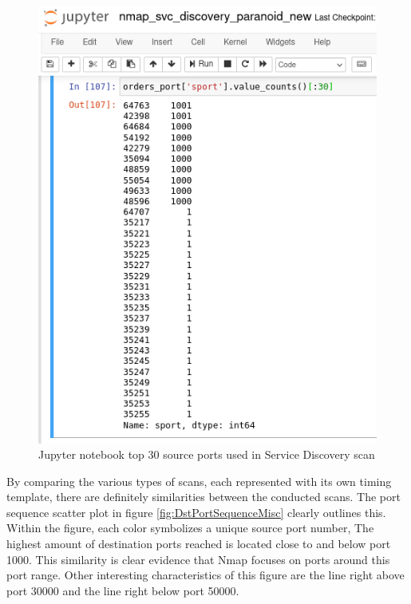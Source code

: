 \begin{figure}[ht]%
    \centering
    \includegraphics[scale=0.35]{images/analysis/svcscan/JupyterSvcSrcUniquePorts.png}
    \caption{Jupyter notebook top 30 source ports used in Service Discovery scan}%
    \label{fig:JupyterSvcSrcPort}%
\end{figure}



By comparing the various types of scans, each represented with its own timing template, there are definitely similarities between the conducted scans. The port sequence scatter plot in figure \ref{fig:DstPortSequenceMisc} clearly outlines this.
Within the figure, each color symbolizes a unique source port number,
The highest amount of destination ports reached is located close to and below port 1000.
This similarity is clear evidence that Nmap focuses on ports around this port range.
Other interesting characteristics of this figure are the line right above port 30000 and the line right below port 50000.

\vfill
\clearpage

